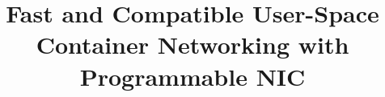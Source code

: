\documentclass[]{sigplanconf}
\begin{document}
\setlength{\pdfpageheight}{\paperheight}
\setlength{\pdfpagewidth}{\paperwidth}


\title{Fast and Compatible User-Space Container Networking with Programmable NIC\vspace{-0.1in}}


\newcommand{\authornote}[1]{\raisebox{0.8ex}{$#1$}}
\maketitle

\newcommand{\specialcell}[2][c]{%
  \begin{tabular}[#1]{@{}c@{}}#2\end{tabular}}






%


\balance


\end{document}
